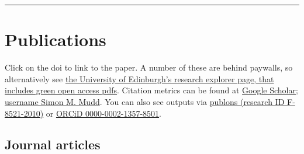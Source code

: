 \documentclass[10pt, a4paper]{article}
\begin{document}
\hrule
\section*{Publications}
Click on the doi to link to the paper. 
A number of these are behind paywalls, so alternatively see \href{https://www.research.ed.ac.uk/portal/en/persons/simon-mudd(597e4975-68c0-4175-8119-0d22d1438753).html}{the University of Edinburgh’s research explorer page, that includes green open access pdfs}. 
Citation metrics can be found at \href{http://scholar.google.com/citations?user=9iv6l7wAAAAJ\&hl=en}{Google Scholar; username Simon M. Mudd}. 
You can also see outputs via \href{https://publons.com/researcher/2825683/simon-m-mudd/}{publons (research ID F-8521-2010)} or \href{https://orcid.org/0000-0002-1357-8501}{ORCiD 0000-0002-1357-8501}.

\subsection*{Journal articles}
\end{document}
